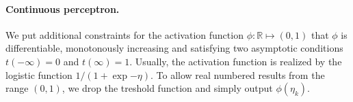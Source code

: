 \paragraph{Continuous perceptron.}
We put additional constraints for the activation function $\phi : \mathbb{R} \mapsto (0,1)$ that $\phi$ is differentiable, monotonously increasing and satisfying two asymptotic conditions $t(-\infty)=0$ and $t(\infty)=1$.  Usually, the activation function is realized by the logistic function $1 / (1 + \exp{-\eta})$. To allow real numbered results from the range $(0,1)$, we drop the treshold function and simply output $\phi(\eta_k)$. 
